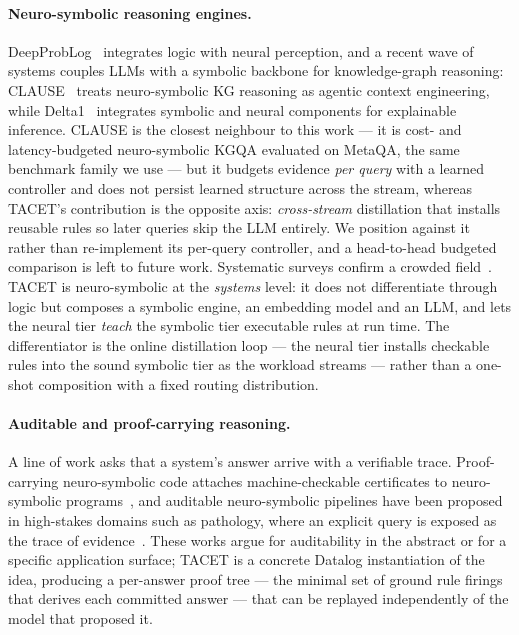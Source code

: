 \documentclass[11pt]{article}
\theoremstyle{plain}
\begin{document}
\paragraph{Neuro-symbolic reasoning engines.}
DeepProbLog~\citep{manhaeve2018deepproblog} integrates logic with neural
perception, and a recent wave of systems couples LLMs with a symbolic
backbone for knowledge-graph reasoning: CLAUSE~\citep{clause2025} treats
neuro-symbolic KG reasoning as agentic context engineering, while
Delta1~\citep{delta1llm2026} integrates symbolic and neural components for
explainable inference. CLAUSE is the closest neighbour to this work --- it
is cost- and latency-budgeted neuro-symbolic KGQA evaluated on MetaQA, the
same benchmark family we use --- but it budgets evidence \emph{per query}
with a learned controller and does not persist learned structure across the
stream, whereas TACET's contribution is the opposite axis: \emph{cross-stream}
distillation that installs reusable rules so later queries skip the LLM
entirely. We position against it rather than re-implement its per-query
controller, and a head-to-head budgeted comparison is left to future work.
Systematic surveys confirm a crowded field~\citep{nsreview2025,nskgsurvey2024}. TACET is neuro-symbolic at the
\emph{systems} level: it does not differentiate through logic but composes a
symbolic engine, an embedding model and an LLM, and lets the neural tier
\emph{teach} the symbolic tier executable rules at run time. The
differentiator is the online distillation loop --- the neural tier installs
checkable rules into the sound symbolic tier as the workload streams ---
rather than a one-shot composition with a fixed routing distribution.

\paragraph{Auditable and proof-carrying reasoning.} A line of work asks
that a system's answer arrive with a verifiable trace.
Proof-carrying neuro-symbolic code attaches machine-checkable certificates to
neuro-symbolic programs~\citep{proofcarrying2025}, and auditable
neuro-symbolic pipelines have been proposed in high-stakes domains such as
pathology, where an explicit query is exposed as the trace of
evidence~\citep{auditpathology2026}. These works argue for auditability in
the abstract or for a specific application surface; TACET is a concrete
Datalog instantiation of the idea, producing a per-answer proof tree --- the
minimal set of ground rule firings that derives each committed answer ---
that can be replayed independently of the model that proposed it.
\end{document}
